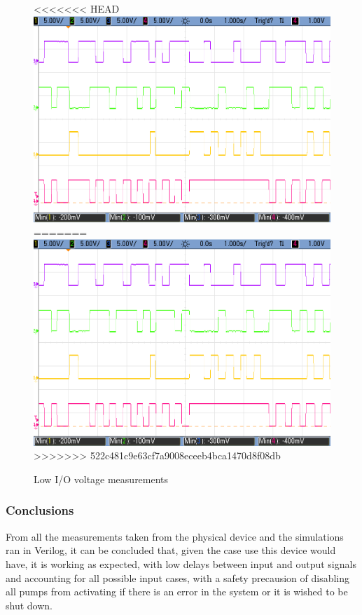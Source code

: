 \begin{figure}[H]
    \begin{center}
<<<<<<< HEAD
        \includegraphics[scale=0.3]{../Exercise1/Moore/report/images/e3e1_1s4i_2b1_2b2_v0.png}
=======
        \includegraphics[width=0.75\linewidth]{./images/e3e1_1s4i_2b1_2b2_v0.png}
>>>>>>> 522c481c9e63cf7a9008eceeb4bca1470d8f08db
        \caption{Low I/O voltage measurements}
        \label{fig:moore_min}
    \end{center}
\end{figure}

\newpage
\subsubsection{\color{orange}Conclusions}
From all the measurements taken from the physical device and the simulations ran in Verilog, it can be concluded
that, given the case use this device would have, it is working as expected, with low delays between input and
output signals and accounting for all possible input cases, with a safety precausion of disabling all pumps from
activating if there is an error in the system or it is wished to be shut down.